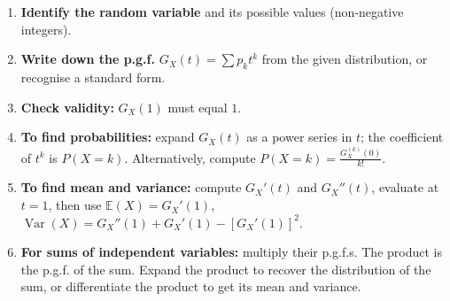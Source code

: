 \documentclass[11pt]{article}
\begin{document}
\begin{methode}
\begin{enumerate}
\item \textbf{Identify the random variable} and its possible values (non‑negative integers).
\item \textbf{Write down the p.g.f.} $G_X(t) = \sum p_k t^k$ from the given distribution, or recognise a standard form.
\item \textbf{Check validity:} $G_X(1)$ must equal $1$.
\item \textbf{To find probabilities:} expand $G_X(t)$ as a power series in $t$; the coefficient of $t^k$ is $P(X=k)$. Alternatively, compute $P(X=k)=\frac{G_X^{(k)}(0)}{k!}$.
\item \textbf{To find mean and variance:} compute $G_X'(t)$ and $G_X''(t)$, evaluate at $t=1$, then use
      $\mathbb{E}(X)=G_X'(1)$,
      $\operatorname{Var}(X)=G_X''(1)+G_X'(1)-[G_X'(1)]^2$.
\item \textbf{For sums of independent variables:} multiply their p.g.f.s. The product is the p.g.f. of the sum. Expand the product to recover the distribution of the sum, or differentiate the product to get its mean and variance.
\end{enumerate}
\end{methode}
\end{document}
